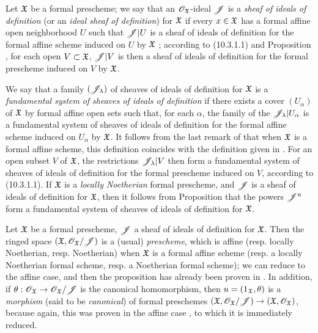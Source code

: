 \begin{env}[10.5.1]
\label{1.10.5.1}
Let $\mathfrak{X}$ be a formal prescheme; we say that an $\mathscr{O}_\mathfrak{X}$-ideal $\mathscr{J}$ is a \emph{sheaf of ideals of definition} (or an \emph{ideal sheaf of definition}) for $\mathfrak{X}$ if every $x\in\mathfrak{X}$ has a formal affine open neighborhood $U$ such that $\mathscr{J}|U$ is a sheaf of ideals of definition for the formal affine scheme induced on $U$ by $\mathfrak{X}$ ; according to (10.3.1.1) and Proposition , for each open $V\subset\mathfrak{X}$, $\mathscr{J}|V$ is then a sheaf of ideals of definition for the formal prescheme induced on $V$ by $\mathfrak{X}$.

We say that a family $(\mathscr{J}_\lambda)$ of sheaves of ideals of definition for $\mathfrak{X}$ is a \emph{fundamental system}
\emph{of sheaves of ideals of definition} if there exists a cover $(U_\alpha)$ of $\mathfrak{X}$ by formal affine open sets such that, for each $\alpha$, the family of the $\mathscr{J}_\lambda|U_\alpha$ is a fundamental system of sheaves of ideals of definition  for the formal affine scheme induced on $U_\alpha$ by $\mathfrak{X}$.
It follows from the last remark of  that when $\mathfrak{X}$ is a formal affine scheme, this definition coincides with the definition given in .
For an open subset $V$ of $\mathfrak{X}$, the restrictions $\mathscr{J}_\lambda|V$ then form a fundamental system of sheaves of ideals of definition for the formal prescheme induced on $V$, according to (10.3.1.1).
If $\mathfrak{X}$ is a \emph{locally Noetherian} formal prescheme, and $\mathscr{J}$ is a sheaf of ideals of definition for $\mathfrak{X}$, then it follows from Proposition  that the powers $\mathscr{J}^n$ form a fundamental system of sheaves of ideals of definition for $\mathfrak{X}$.
\end{env}

\begin{env}[10.5.2]
\label{1.10.5.2}
Let $\mathfrak{X}$ be a formal prescheme, $\mathscr{J}$ a sheaf of ideals of definition for $\mathfrak{X}$.
Then the ringed space $(\mathfrak{X},\mathscr{O}_\mathfrak{X}/\mathscr{J})$ is a (usual) \emph{prescheme}, which is affine (resp. locally Noetherian, resp. Noetherian) when $\mathfrak{X}$ is a formal affine scheme (resp. a locally Noetherian formal scheme, resp. a Noetherian formal scheme);  we can reduce to the affine case, and then the proposition has already been proven in .
In addition, if $\theta:\OO_\fk{X}\to\OO_\fk{X}/\sh{J}$ is the canonical homomorphism, then $u=(1_\mathfrak{X},\theta)$ is a \emph{morphism} (said to be \emph{canonical}) of formal preschemes $(\fk{X},\OO_\fk{X}/\sh{J})\to(\fk{X},\OO_\fk{X})$, because again, this was proven in the affine case , to which it is immediately reduced.
\end{env}

